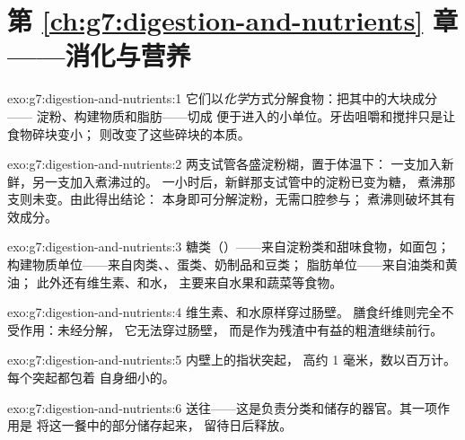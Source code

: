 \section*{第 \ref{ch:g7:digestion-and-nutrients} 章——消化与营养}

\begin{solution}{exo:g7:digestion-and-nutrients:1}
它们以\emph{化学}方式分解食物：把其中的大块成分——
淀粉、构建物质和脂肪——切成
便于进入的小单位。牙齿咀嚼和搅拌只是让食物碎块变小；
则改变了这些碎块的本质。
\end{solution}

\begin{solution}{exo:g7:digestion-and-nutrients:2}
两支试管各盛淀粉糊，置于体温下：
一支加入新鲜，另一支加入煮沸过的。
一小时后，新鲜那支试管中的淀粉已变为糖，
煮沸那支则未变。由此得出结论：
本身即可分解淀粉，无需口腔参与；
煮沸则破坏其有效成分。
\end{solution}

\begin{solution}{exo:g7:digestion-and-nutrients:3}
糖类（）——来自淀粉类和甜味食物，如面包；
构建物质单位——来自肉类、、蛋类、奶制品和豆类；
脂肪单位——来自油类和黄油；
此外还有维生素、和水，
主要来自水果和蔬菜等食物。
\end{solution}

\begin{solution}{exo:g7:digestion-and-nutrients:4}
维生素、和水原样穿过肠壁。
膳食纤维则完全不受作用：未经分解，
它无法穿过肠壁，
而是作为残渣中有益的粗渣继续前行。
\end{solution}

\begin{solution}{exo:g7:digestion-and-nutrients:5}
内壁上的指状突起，
高约 1 毫米，数以百万计。每个突起都包着
自身细小的。
\end{solution}

\begin{solution}{exo:g7:digestion-and-nutrients:6}
送往——这是负责分类和储存的器官。其一项作用是
将这一餐中的部分储存起来，
留待日后释放。
\end{solution}

